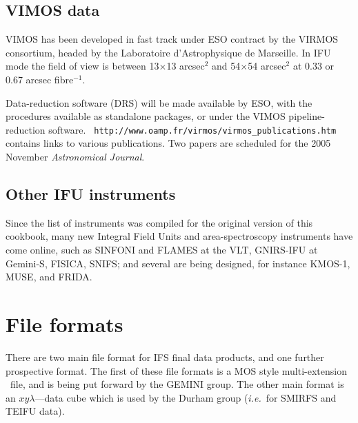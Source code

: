 \documentclass[twoside,11pt]{article}
\newcommand{\htmladdnormallink}[2]{#1}
\newcommand{\htmlref}[2]{#1}
\newcommand{\xlabel}[1]{}
\begin{document}
\begin{\htmlonly}
\subsection{\xlabel{sc16_vimos}VIMOS data\label{sc16_vimos}}

\htmladdnormallink{VIMOS}{http://www.eso.org/instruments/vimos/} has
been developed in fast track under ESO contract by the VIRMOS
consortium, headed by the Laboratoire d'Astrophysique de Marseille. In
IFU mode the field of view is between 13$\times$13 arcsec$^2$ and
54$\times$54 arcsec$^2$ at 0.33 or 0.67 arcsec fibre$^{-1}$.

Data-reduction software (DRS) will be made available by ESO, with the
procedures available as standalone packages, or under the VIMOS
pipeline-reduction software.\goodbreak
\htmladdnormallink{{\tt
http://www.oamp.fr/virmos/virmos\_publications.htm}}{http://www.oamp.fr/virmos/virmos_publications.htm}
contains links to various publications.  Two papers are scheduled for
the 2005 November {\em Astronomical Journal}.

\subsection{\xlabel{sc16_other}Other IFU instruments\label{sc16_other}}

Since the list of instruments was compiled for the original version of
this cookbook, many new Integral Field Units and area-spectroscopy
instruments have come online, such as
\htmladdnormallink{SINFONI}{http://www.eso.org/instruments/sinfoni/}
and \htmladdnormallink{FLAMES}{http://www.eso.org/instruments/flames/}
at the VLT,
\htmladdnormallink{GNIRS-IFU}{http://www.gemini.edu/sciops/instruments/nirs/nirsIndex.html}
at Gemini-S,
\htmladdnormallink{FISICA}{http://www.ctio.noao.edu/diroff/TALKS_PDF/Eikenberry_fisica_ctio05.pdf},
SNIFS; and several are being designed, for instance
\htmladdnormallink{KMOS-1}{http://www.cfai.dur.ac.uk/fix/projects/kmos1/kmos_main.html},
\htmladdnormallink{MUSE}{http://www.cfai.dur.ac.uk/fix/projects/muse/muse.html},
and FRIDA.

\newpage
\section{\xlabel{sc16_fileformat}File formats\label{sc16_fileformat}}

There are two main file format for IFS final data products, and one
further prospective format.  The \htmlref{first}{sc16_gmosfile} of
these file formats is a MOS style multi-extension 
\FITSref\ file, and is
being put forward by the GEMINI group.  The other main format is an
$xy\lambda$---\htmlref{data cube}{sc16_teifufile} which is used by the
Durham group (\emph{i.e.}\ for SMIRFS and TEIFU data).


\end{\htmlonly}
\end{document}
